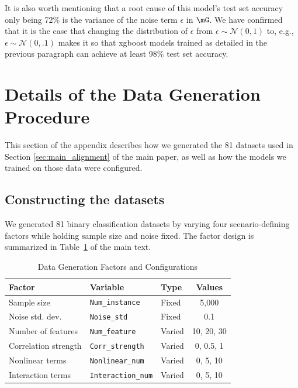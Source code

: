\documentclass[11pt]{article}
\begin{document}
It is also worth mentioning that a root cause of this model's test set accuracy only being 72\% is the variance of the noise term $\epsilon$ in $\mG$. We have confirmed that it is the case that changing the distribution of $\epsilon$ from $\epsilon \sim \mathcal{N}(0,1)$ to, e.g., $\epsilon \sim \mathcal{N}(0,.1)$ makes it so that xgboost models trained as detailed in the previous paragraph can achieve at least 98\% test set accuracy. 
  


\section{Details of the Data Generation Procedure}
\label{apx_sec:81_details}

This section of the appendix describes how we generated the 81 datasets used in Section \ref{sec:main_alignment} of the main paper, as well as how the models we trained on those data were configured.

\subsection{Constructing the datasets}

We generated 81 binary classification datasets by varying four scenario-defining factors while holding sample size and noise fixed. The factor design is summarized in Table~\ref{tab:data_factors} of the main text. 
\begin{table}[htbp]
\centering
\small
\caption{Data Generation Factors and Configurations}
\label{tab:data_factors}
\begin{tabular}{lllc}
\toprule
\textbf{Factor} & \textbf{Variable} & \textbf{Type} & \textbf{Values} \\
\midrule
Sample size & \texttt{Num\_instance} & Fixed & 5{,}000 \\
Noise std. dev. & \texttt{Noise\_std} & Fixed & 0.1 \\
Number of features & \texttt{Num\_feature} & Varied & 10, 20, 30 \\
Correlation strength & \texttt{Corr\_strength} & Varied & 0, 0.5, 1 \\
Nonlinear terms & \texttt{Nonlinear\_num} & Varied & 0, 5, 10 \\
Interaction terms & \texttt{Interaction\_num} & Varied & 0, 5, 10 \\
\bottomrule
\end{tabular}
\end{table}\normalsize
\end{document}
